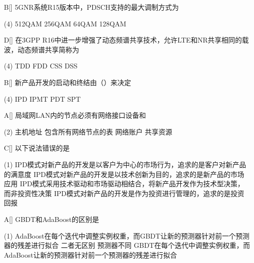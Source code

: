 \begin{choice}{B}[]
    5G\;NR系统R15版本中，PDSCH支持的最大调制方式为
    \begin{tasks}(4)
        \task 512QAM
        \task 256QAM
        \task 64QAM
        \task 128QAM
    \end{tasks}
\end{choice}


\begin{choice}{D}[]
    在3GPP R16中进一步增强了动态频谱共享技术，允许LTE和NR共享相同的载波，动态频谱共享简称为
    \begin{tasks}(4)
        \task TDD
        \task FDD
        \task CSS
        \task DSS
    \end{tasks}
\end{choice}



\begin{choice}{B}[]
    新产品开发的启动和终结由（\quad）来决定
    \begin{tasks}(4)
        \task IPD
        \task IPMT
        \task PDT
        \task SPT
    \end{tasks}
\end{choice}


\begin{choice}{A}[]
    局域网LAN内的节点必须有网络接口设备和
    \begin{tasks}(2)
        \task 主机地址
        \task 包含所有网络节点的表
        \task 网络账户
        \task 共享资源
    \end{tasks}
\end{choice}


\begin{choice}{C}[]
    以下说法错误的是
    \begin{tasks}(1)
        \task IPD模式对新产品的开发是以客户为中心的市场行为，追求的是客户对新产品的满意度
        \task IPD模式对新产品的开发是以技术创新为目的，追求的是新产品的市场应用
        \task IPD模式采用技术驱动和市场驱动相结合，将新产品开发作为技术型决策，而非投资性决策
        \task IPD模式对新产品的开发是作为投资进行管理的，追求的是投资回报
    \end{tasks}
\end{choice}


\begin{choice}{A}[]
    GBDT和AdaBoost的区别是
    \begin{tasks}(1)
        \task AdaBoost在每个迭代中调整实例权重，而GBDT让新的预测器针对前一个预测器的残差进行拟合
        \task 二者无区别
        \task 预测器不同
        \task GBDT在每个迭代中调整实例权重，而AdaBoost让新的预测器针对前一个预测器的残差进行拟合
    \end{tasks}
\end{choice}



